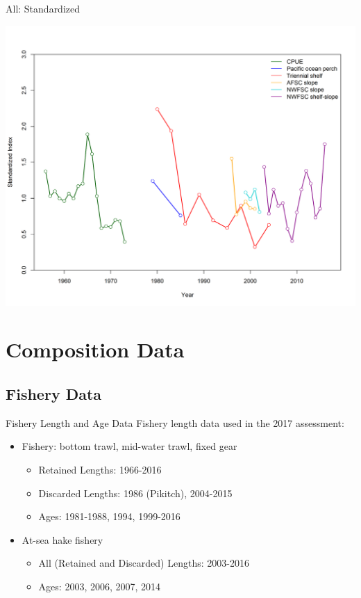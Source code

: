 \documentclass[pdf]{beamer}\usepackage[]{graphicx}\usepackage[]{color}
\begin{document}
\begin{frame}{All: Standardized}
  \begin{center}
  \includegraphics[scale = 0.37]{figures/Index_Standardized.png}
  \end{center}
\end{frame}


\section{Composition Data}
\subsection{Fishery Data}
\begin{frame}{Fishery Length and Age Data}
  Fishery length data used in the 2017 assessment:
  \begin{itemize}
    \item Fishery: bottom trawl, mid-water trawl, fixed gear
      \begin{itemize}
        \item Retained Lengths: 1966-2016
        \item Discarded Lengths: 1986 (Pikitch), 2004-2015
        \item Ages: 1981-1988, 1994, 1999-2016
      \end{itemize}
    \item At-sea hake fishery
      \begin{itemize}
        \item All (Retained and Discarded) Lengths: 2003-2016
        \item Ages: 2003, 2006, 2007, 2014
      \end{itemize}
  \end{itemize}
\end{frame}
\end{document}
